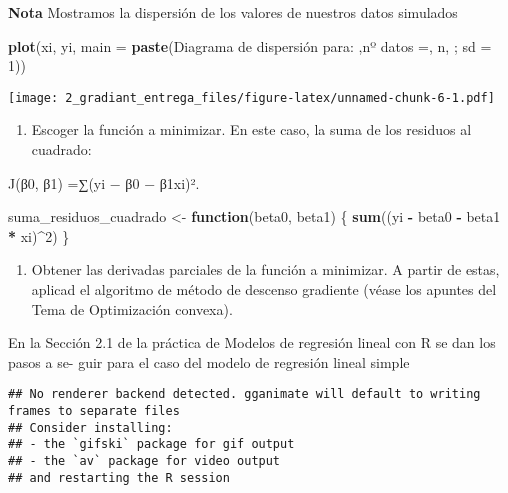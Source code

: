 \documentclass[
]{article}
\newenvironment{Shaded}{\begin{snugshade}}{\end{snugshade}}
\newcommand{\AttributeTok}[1]{\textcolor[rgb]{0.13,0.29,0.53}{#1}}
\newcommand{\ControlFlowTok}[1]{\textcolor[rgb]{0.13,0.29,0.53}{\textbf{#1}}}
\newcommand{\DecValTok}[1]{\textcolor[rgb]{0.00,0.00,0.81}{#1}}
\newcommand{\FunctionTok}[1]{\textcolor[rgb]{0.13,0.29,0.53}{\textbf{#1}}}
\newcommand{\NormalTok}[1]{#1}
\newcommand{\OtherTok}[1]{\textcolor[rgb]{0.56,0.35,0.01}{#1}}
\newcommand{\SpecialCharTok}[1]{\textcolor[rgb]{0.81,0.36,0.00}{\textbf{#1}}}
\newcommand{\StringTok}[1]{\textcolor[rgb]{0.31,0.60,0.02}{#1}}
\providecommand{\tightlist}{%
  \setlength{\itemsep}{0pt}\setlength{\parskip}{0pt}}
\begin{document}
\textbf{Nota} Mostramos la dispersión de los valores de nuestros datos
simulados

\begin{Shaded}
\begin{Highlighting}[]
\FunctionTok{plot}\NormalTok{(xi, yi, }\AttributeTok{main =} \FunctionTok{paste}\NormalTok{(}\StringTok{\textquotesingle{}Diagrama de dispersión para: \textquotesingle{}}\NormalTok{,}\StringTok{\textquotesingle{}nº datos =\textquotesingle{}}\NormalTok{, n, }\StringTok{\textquotesingle{}; sd = 1\textquotesingle{}}\NormalTok{))}
\end{Highlighting}
\end{Shaded}

\texttt{[image: 2\_gradiant\_entrega\_files/figure-latex/unnamed-chunk-6-1.pdf]}

\begin{enumerate}
\def\labelenumi{\arabic{enumi}.}
\setcounter{enumi}{1}
\tightlist
\item
  Escoger la función a minimizar. En este caso, la suma de los residuos
  al cuadrado:
\end{enumerate}

J(β0, β1) =∑(yi − β0 − β1xi)².

\begin{Shaded}
\begin{Highlighting}[]
\NormalTok{suma\_residuos\_cuadrado }\OtherTok{\textless{}{-}} \ControlFlowTok{function}\NormalTok{(beta0, beta1) \{}
  \FunctionTok{sum}\NormalTok{((yi }\SpecialCharTok{{-}}\NormalTok{ beta0 }\SpecialCharTok{{-}}\NormalTok{ beta1 }\SpecialCharTok{*}\NormalTok{ xi)}\SpecialCharTok{\^{}}\DecValTok{2}\NormalTok{)}
\NormalTok{\}}
\end{Highlighting}
\end{Shaded}

\begin{enumerate}
\def\labelenumi{\arabic{enumi}.}
\setcounter{enumi}{2}
\tightlist
\item
  Obtener las derivadas parciales de la función a minimizar. A partir de
  estas, aplicad el algoritmo de método de descenso gradiente (véase los
  apuntes del Tema de Optimización convexa).
\end{enumerate}

En la Sección 2.1 de la práctica de Modelos de regresión lineal con R se
dan los pasos a se- guir para el caso del modelo de regresión lineal
simple

\begin{verbatim}
## No renderer backend detected. gganimate will default to writing frames to separate files
## Consider installing:
## - the `gifski` package for gif output
## - the `av` package for video output
## and restarting the R session
\end{verbatim}
\end{document}
